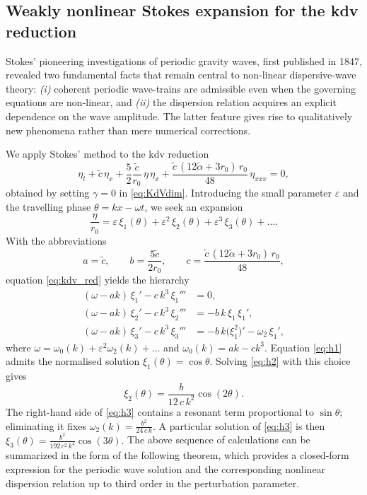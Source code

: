 \documentclass[alpha-refs, 12pt]{wiley-article}
\newcommand{\eps}{\varepsilon}
\begin{document}
\subsection{Weakly nonlinear Stokes expansion for the \acrshort{kdv} reduction}

Stokes' pioneering investigations of periodic gravity waves, first published in 1847, revealed two fundamental facts that remain central to non-linear dispersive‐wave theory: \textit{(i)} coherent periodic wave-trains are admissible even when the governing equations are non-linear, and \textit{(ii)} the dispersion relation acquires an explicit dependence on the wave amplitude. The latter feature gives rise to qualitatively new phenomena rather than mere numerical corrections.

We apply Stokes' method to the \acrshort{kdv} reduction
\begin{equation}\label{eq:kdv_red}
  \eta_{t}
  +\tilde{c}\,\eta_{x}
  +\frac{5}{2}\frac{\tilde{c}}{r_{0}}\,
   \eta\,\eta_{x}
  +\frac{\tilde{c}\,(12\tilde{\alpha}+3r_{0})\,r_{0}}{48}\,
   \eta_{xxx}
  =0,
\end{equation}
obtained by setting $\gamma = 0$ in \eqref{eq:KdVdim}. Introducing the small parameter $\eps$ and the travelling phase $\theta=kx-\omega t$, we seek an expansion
\begin{equation}\label{eq:stokes_ansatz}
  \frac{\eta}{r_{0}} = \eps\,\xi_{1}(\theta) + \eps^{2}\,\xi_{2}(\theta) + \eps^{3}\,\xi_{3}(\theta) + \dots.
\end{equation}
With the abbreviations
\[
  a=\tilde{c},\qquad
  b=\frac{5\tilde{c}}{2r_{0}},\qquad
  c=\frac{\tilde{c}\,(12\tilde{\alpha}+3r_{0})\,r_{0}}{48},
\]
equation \eqref{eq:kdv_red} yields the hierarchy
\begin{align}
  (\omega-ak)\,\xi_{1}'-c\,k^{3}\,\xi_{1}''' &=0, \label{eq:h1}\\
  (\omega-ak)\,\xi_{2}'-c\,k^{3}\,\xi_{2}''' &=-b\,k\,\xi_{1}\,\xi_{1}',
             \label{eq:h2}\\
  (\omega-ak)\,\xi_{3}'-c\,k^{3}\,\xi_{3}'''
     &=-b\,k\bigl(\xi_{1}^{2}\bigr)'
       -\omega_{2}\,\xi_{1}', \label{eq:h3}
\end{align}
where
\(
  \omega=\omega_{0}(k)+\eps^{2}\omega_{2}(k)+\dots
\)
and
\(
  \omega_{0}(k)=ak-ck^{3}.
\)
Equation \eqref{eq:h1} admits the normalised solution
\(
  \xi_{1}(\theta)=\cos\theta.
\)
Solving \eqref{eq:h2} with this choice gives
\[
  \xi_{2}(\theta)=\frac{b}{12\,c\,k^{2}}\cos(2\theta).
\]
The right-hand side of \eqref{eq:h3} contains a resonant term
proportional to $\sin\theta$; eliminating it fixes
\(
  \displaystyle
  \omega_{2}(k)=\frac{b^{2}}{24\,c\,k}.
\)
A particular solution of \eqref{eq:h3} is then
\(
  \displaystyle
  \xi_{3}(\theta)=\frac{b^{2}}{192\,c^{2}\,k^{4}}\cos(3\theta).
\)
The above sequence of calculations can be summarized in the form of the following theorem, which provides a closed-form expression for the periodic wave solution and the corresponding nonlinear dispersion relation up to third order in the perturbation parameter.
\end{document}
